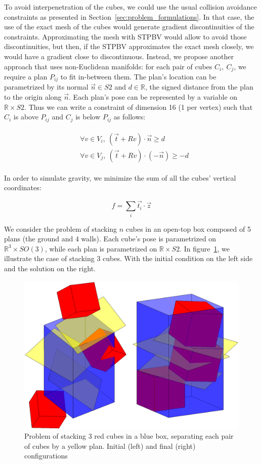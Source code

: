 To avoid interpenetration of the cubes, we could use the usual collision avoidance constraints as presented in Section~\ref{sec:problem_formulations}.
In that case, the use of the exact mesh of the cubes would generate gradient discontinuities of the constraints.
Approximating the mesh with STPBV would allow to avoid those discontinuities, but then, if the STPBV approximates the exact mesh closely, we would have a gradient close to discontinuous.
Instead, we propose another approach that uses non-Euclidean manifolds: for each pair of cubes $C_i,\ C_j$, we require a plan $P_{ij}$ to fit in-between them.
The plan's location can be parametrized by its normal $\vec{n}\in S2$ and $d\in\mathbb{R}$, the signed distance from the plan to the origin along $\vec{n}$.
Each plan's pose can be represented by a variable on $\mathbb{R} \times S2$.
Thus we can write a constraint of dimension 16 (1 per vertex) such that $C_i$ is above $P_{ij}$ and $C_j$ is below $P_{ij}$ as follows:

\begin{align}
  \begin{split}
    &\forall v\in V_i,\ (\vec{t} + R v)\cdot \vec{n} \geq d \\
    &\forall v\in V_j,\ (\vec{t} + R v)\cdot \left(-\vec{n}\right) \geq -d
  \end{split}
\end{align}

In order to simulate gravity, we minimize the sum of all the cubes' vertical coordinates:

\begin{equation}
  f = \sum\limits_i \vec{t_i}\cdot \vec{z}
\end{equation}

We consider the problem of stacking $n$ cubes in an open-top box composed of 5 plans (the ground and 4 walls).
Each cube's pose is parametrized on $\mathbb{R}^3\times SO(3)$, while each plan is parametrized on $\mathbb{R}\times S2$.
In figure~\ref{fig:cubes}, we illustrate the case of stacking 3 cubes.
With the initial condition on the left side and the solution on the right.
\begin{figure}
\centering
  \includegraphics[width=.8\linewidth]{3cubes.png}
  \caption{Problem of stacking 3 red cubes in a blue box, separating each pair of cubes by a yellow plan. Initial (left) and final (right) configurations}
\label{fig:cubes}
\end{figure}

